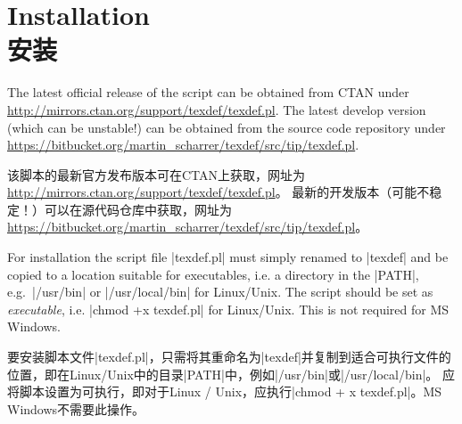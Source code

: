 \documentclass{article}
\begin{document}

\section{Installation\\安装}\label{sec:install}

The latest official release of the script can be obtained from CTAN under \url{http://mirrors.ctan.org/support/texdef/texdef.pl}.
The latest develop version (which can be unstable!) can be obtained from the source code repository under 
\url{https://bitbucket.org/martin_scharrer/texdef/src/tip/texdef.pl}.

该脚本的最新官方发布版本可在CTAN上获取，网址为\url{http://mirrors.ctan.org/support/texdef/texdef.pl}。
最新的开发版本（可能不稳定！）可以在源代码仓库中获取，网址为\url{https://bitbucket.org/martin_scharrer/texdef/src/tip/texdef.pl}。

For installation the script file |texdef.pl| must simply renamed to |texdef| and be copied to a location suitable for executables,
i.e. a directory in the |PATH|, e.g.\ |/usr/bin| or |/usr/local/bin| for Linux/Unix.
The script should be set as \emph{executable}, i.e. |chmod +x texdef.pl| for Linux/Unix.
This is not required for MS Windows.

要安装脚本文件|texdef.pl|，只需将其重命名为|texdef|并复制到适合可执行文件的位置，即在Linux/Unix中的目录|PATH|中，例如|/usr/bin|或|/usr/local/bin|。
应将脚本设置为可执行，即对于Linux / Unix，应执行|chmod + x texdef.pl|。MS Windows不需要此操作。

\end{document}
